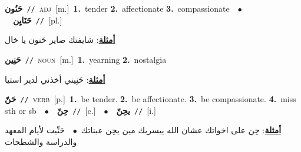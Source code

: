 \documentclass[10pt,a4paper,twoside]{article} %
\begin{document}
\begin{multicols}{2}
{\setlength\topsep{0pt}\textbf{\foreignlanguage{arabic}{حَنُون}}\ {\color{gray}\texttt{//}\color{black}}\ \textsc{adj}\ [m.]\ \textbf{1.}~tender  \textbf{2.}~affectionate  \textbf{3.}~compassionate\ \ $\bullet$\ \ \setlength\topsep{0pt}\textbf{\foreignlanguage{arabic}{حَنَايِن}}\ {\color{gray}\texttt{//}\color{black}}\ [pl.]\  \begin{flushright}\color{gray}\foreignlanguage{arabic}{\textbf{\underline{\foreignlanguage{arabic}{أمثلة}}}: شايفتك صاير حَنون يا خال}\end{flushright}\color{black}} \vspace{2mm}

{\setlength\topsep{0pt}\textbf{\foreignlanguage{arabic}{حَنِين}}\ {\color{gray}\texttt{//}\color{black}}\ \textsc{noun}\ [m.]\ \textbf{1.}~yearning  \textbf{2.}~nostalgia\  \begin{flushright}\color{gray}\foreignlanguage{arabic}{\textbf{\underline{\foreignlanguage{arabic}{أمثلة}}}: حَنِيني أخذني لدير استيا}\end{flushright}\color{black}} \vspace{2mm}

{\setlength\topsep{0pt}\textbf{\foreignlanguage{arabic}{حَنّ}}\ {\color{gray}\texttt{//}\color{black}}\ \textsc{verb}\ [p.]\ \textbf{1.}~be tender.  \textbf{2.}~be affectionate.  \textbf{3.}~be compassionate.  \textbf{4.}~miss sth or sb\ \ $\bullet$\ \ \setlength\topsep{0pt}\textbf{\foreignlanguage{arabic}{حِنّ}}\ {\color{gray}\texttt{//}\color{black}}\ [c.]\ \ $\bullet$\ \ \setlength\topsep{0pt}\textbf{\foreignlanguage{arabic}{يحِنّ}}\ {\color{gray}\texttt{//}\color{black}}\ [i.]\  \begin{flushright}\color{gray}\foreignlanguage{arabic}{\textbf{\underline{\foreignlanguage{arabic}{أمثلة}}}: حِن على اخواتك عشان الله ييسربك مين يحِن عبناتك\ $\bullet$\ \  حَنِّيت لأيام المعهد والدراسة والشطحات}\end{flushright}\color{black}} \vspace{2mm}


\end{multicols}
\end{document}
